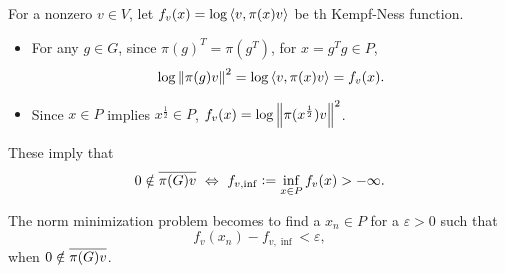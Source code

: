 \documentclass[suri,pdfbookmark]{engsuribt} %
\begin{document}
  For a nonzero $v \in V$, let $f_v(x) = \log\left\langle v,\pi(x)v \right\rangle$ be th Kempf-Ness function. 
  \begin{itemize}
    \item For any $g \in G$, since $\pi(g)^T = \pi(g^T)$, for $x = g^Tg \in P$,
    \begin{equation*}
      \log\left\lVert\pi(g)v\right\lVert^2 = \log \left\langle v,\pi(x)v \right\rangle = f_v(x). 
    \end{equation*}
    \item Since $x \in P$ implies $x^{\frac{1}{2}} \in P$, $f_v(x) = \log \left\lVert\pi(x^{\frac{1}{2}})v\right\lVert^2$.
  \end{itemize}
  These imply that
  \begin{equation*}
    0 \notin \overline{\pi(G)v} ~\Leftrightarrow~ f_{v,\inf} \vcentcolon= \inf_{x \in P} f_v(x) > -\infty.
  \end{equation*}

  The norm minimization problem becomes to find a $x_n \in P$ for a $\varepsilon > 0$ such that
  \begin{equation*}
    f_v(x_n) - f_{v,\inf} < \varepsilon,
  \end{equation*}
  when $0 \notin \overline{\pi(G)v}$.
\end{document}

